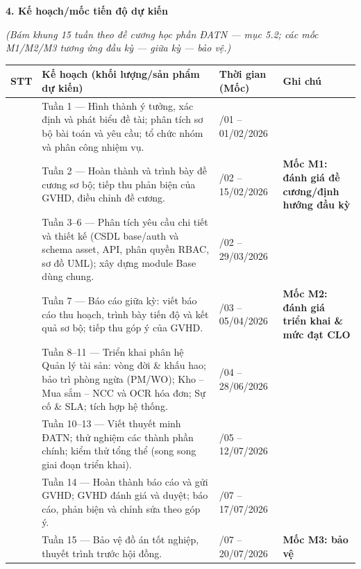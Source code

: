 \textbf{4. Kế hoạch/mốc tiến độ dự kiến}

\textit{(Bám khung 15 tuần theo đề cương học phần ĐATN — mục 5.2; các mốc M1/M2/M3 tương ứng đầu kỳ — giữa kỳ — bảo vệ.)}

\begin{center}{\singlespacing\renewcommand{\arraystretch}{1.25}
\begin{tabular}{|>{\centering\arraybackslash}p{}|>{\raggedright\arraybackslash}p{}|>{\raggedright\arraybackslash}p{}|>{\raggedright\arraybackslash}p{}|}
\hline
\textbf{STT} & \textbf{Kế hoạch (khối lượng/sản phẩm dự kiến)} & \textbf{Thời gian (Mốc)} & \textbf{Ghi chú} \\ \hline
1 & Tuần 1 — Hình thành ý tưởng, xác định và phát biểu đề tài; phân tích sơ bộ bài toán và yêu cầu; tổ chức nhóm và phân công nhiệm vụ. & 25/01 – 01/02/2026 &  \\ \hline
2 & Tuần 2 — Hoàn thành và trình bày đề cương sơ bộ; tiếp thu phản biện của GVHD, điều chỉnh đề cương. & 02/02 – 15/02/2026 & \textbf{Mốc M1: đánh giá đề cương/định hướng đầu kỳ} \\ \hline
3 & Tuần 3–6 — Phân tích yêu cầu chi tiết và thiết kế (CSDL base/auth và schema asset, API, phân quyền RBAC, sơ đồ UML); xây dựng module Base dùng chung. & 16/02 – 29/03/2026 &  \\ \hline
4 & Tuần 7 — Báo cáo giữa kỳ: viết báo cáo thu hoạch, trình bày tiến độ và kết quả sơ bộ; tiếp thu góp ý của GVHD. & 30/03 – 05/04/2026 & \textbf{Mốc M2: đánh giá triển khai \& mức đạt CLO} \\ \hline
5 & Tuần 8–11 — Triển khai phân hệ Quản lý tài sản: vòng đời \& khấu hao; bảo trì phòng ngừa (PM/WO); Kho – Mua sắm – NCC và OCR hóa đơn; Sự cố \& SLA; tích hợp hệ thống. & 06/04 – 28/06/2026 &  \\ \hline
6 & Tuần 10–13 — Viết thuyết minh ĐATN; thử nghiệm các thành phần chính; kiểm thử tổng thể (song song giai đoạn triển khai). & 18/05 – 12/07/2026 &  \\ \hline
7 & Tuần 14 — Hoàn thành báo cáo và gửi GVHD; GVHD đánh giá và duyệt; báo cáo, phản biện và chỉnh sửa theo góp ý. & 13/07 – 17/07/2026 &  \\ \hline
8 & Tuần 15 — Bảo vệ đồ án tốt nghiệp, thuyết trình trước hội đồng. & 18/07 – 20/07/2026 & \textbf{Mốc M3: bảo vệ} \\ \hline
\end{tabular}}\end{center}
